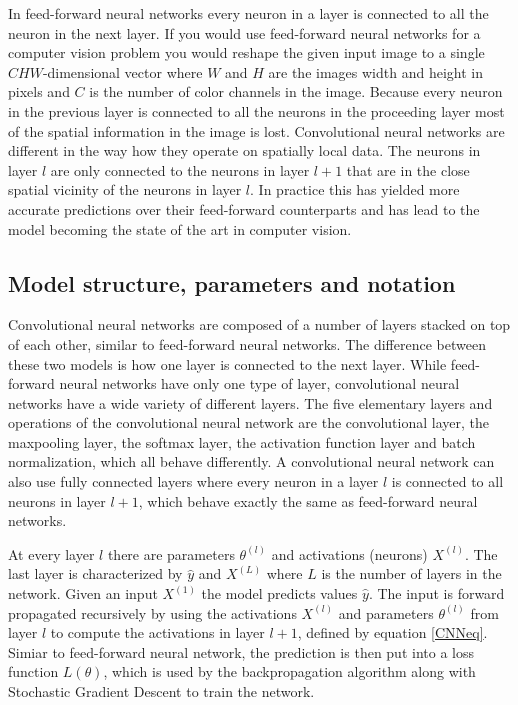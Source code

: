 \documentclass[a4paper, twoside]{article}
\begin{document}
In feed-forward neural networks every neuron in a layer is connected to all the neuron in the next layer. If you would use feed-forward neural networks for a computer vision problem you would reshape the given input image to a single $CHW$-dimensional vector where $W$ and $H$ are the images width and height in pixels and $C$ is the number of color channels in the image. Because every neuron in the previous layer is connected to all the neurons in the proceeding layer most of the spatial information in the image is lost. Convolutional neural networks are different in the way how they operate on spatially local data. The neurons in layer $l$ are only connected to the neurons in layer $l+1$ that are in the close spatial vicinity of the neurons in layer $l$. In practice this has yielded more accurate predictions over their feed-forward counterparts and has lead to the model becoming the state of the art in computer vision. \cite{cs231n} \cite{convmath} \cite{convarithmetic}

\subsection{Model structure, parameters and notation}
Convolutional neural networks are composed of a number of layers stacked on top of each other, similar to feed-forward neural networks. The difference between these two models is how one layer is connected to the next layer. While feed-forward neural networks have only one type of layer, convolutional neural networks have a wide variety of different layers. The five elementary layers and operations of the convolutional neural network are the convolutional layer, the maxpooling layer, the softmax layer, the activation function layer and batch normalization, which all behave differently. A convolutional neural network can also use fully connected layers where every neuron in a layer $l$ is connected to all neurons in layer $l+1$, which behave exactly the same as feed-forward neural networks. \cite{cs231n} \cite{convmath} \cite{convarithmetic}

At every layer $l$ there are parameters $\theta^{(l)}$ and activations (neurons) $X^{(l)}$. The last layer is characterized by $\hat{y}$ and $X^{(L)}$ where $L$ is the number of layers in the network. Given an input $X^{(1)}$ the model predicts values $\hat{y}$. The input is forward propagated recursively by using the activations $X^{(l)}$ and parameters $\theta^{(l)}$ from layer $l$ to compute the activations in layer $l+1$, defined by equation \eqref{CNNeq}. Simiar to feed-forward neural network, the prediction is then put into a loss function $L(\theta)$, which is used by the backpropagation algorithm along with Stochastic Gradient Descent to train the network. \cite{cs231n} \cite{convmath}
\end{document}
